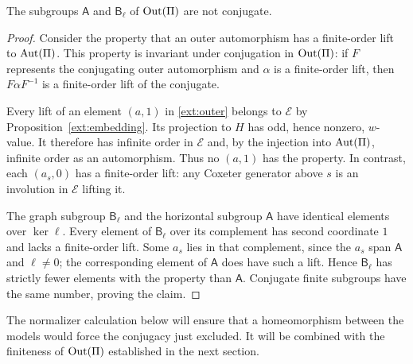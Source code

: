 \begin{proposition}\label{ext:nonconjugate}
The subgroups $\mathsf A$ and $\mathsf B_\ell$ of $\operatorname{Out}(\Pi)$
are not conjugate.
\end{proposition}

\begin{proof}
Consider the property that an outer automorphism has a
finite-order lift to $\operatorname{Aut}(\Pi)$.  This property is invariant
under conjugation in $\operatorname{Out}(\Pi)$: if $F$ represents the
conjugating outer automorphism and $\alpha$ is a finite-order
lift, then $F\alpha F^{-1}$ is a finite-order lift of the
conjugate.

Every lift of an element $(a,1)$ in \eqref{ext:outer} belongs
to $\mathcal E$ by Proposition~\ref{ext:embedding}.  Its
projection to $H$ has odd, hence nonzero, $w$-value.  It
therefore has infinite order in $\mathcal E$ and, by the
injection into $\operatorname{Aut}(\Pi)$, infinite order as an automorphism.
Thus no $(a,1)$ has the property.  In contrast, each
$(a_s,0)$ has a finite-order lift: any Coxeter generator above
$s$ is an involution in $\mathcal E$ lifting it.

The graph subgroup $\mathsf B_\ell$ and the horizontal subgroup
$\mathsf A$ have identical elements over $\ker\ell$.  Every
element of $\mathsf B_\ell$ over its complement has second
coordinate $1$ and lacks a finite-order lift.  Some $a_s$
lies in that complement, since the $a_s$ span $\mathsf A$ and
$\ell\ne0$; the corresponding element of $\mathsf A$ does have
such a lift.  Hence $\mathsf B_\ell$ has strictly fewer
elements with the property than $\mathsf A$.  Conjugate finite
subgroups have the same number, proving the claim.
\end{proof}

The normalizer calculation below will ensure that a homeomorphism
between the models would force the conjugacy just excluded.  It
will be combined with the finiteness of $\operatorname{Out}(\Pi)$ established in the next section.
